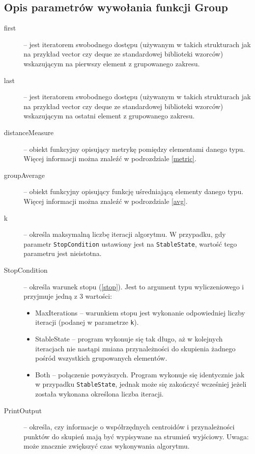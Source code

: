 \subsection{Opis parametrów wywołania funkcji Group}\label{parameters}

\begin{description}
	\item[first] -- jest iteratorem swobodnego dostępu (używanym w takich strukturach jak na przykład vector czy deque ze standardowej biblioteki wzorców) wskazującym na pierwszy element z grupowanego zakresu.
	\item[last] -- jest iteratorem swobodnego dostępu (używanym w takich strukturach jak na przykład vector czy deque ze standardowej biblioteki wzorców) wskazującym na ostatni element z grupowanego zakresu.
	\item[distanceMeasure] -- obiekt funkcyjny opisujący metrykę pomiędzy elementami danego typu. Więcej informacji można znaleźć w podrozdziale \ref{metric}.
	\item[groupAverage] -- obiekt funkcyjny opisujący funkcję uśredniającą elementy danego typu. Więcej informacji można znaleźć w podrozdziale \ref{avg}.
	\item[k] -- określa maksymalną liczbę iteracji algorytmu. W przypadku, gdy parametr \texttt{StopCondition} ustawiony jest na \texttt{StableState}, wartość tego parametru jest nieistotna.
	\item[StopCondition] -- określa warunek stopu (\ref{stop}). Jest to argument typu wyliczeniowego i przyjmuje jedną z 3 wartości:
	\begin{itemize}
		\item MaxIterations -- warunkiem stopu jest wykonanie odpowiedniej liczby iteracji (podanej w parametrze \texttt{k}).
		\item StableState -- program wykonuje się tak długo, aż w kolejnych iteracjach nie nastąpi zmiana przynależności do skupienia żadnego pośród wszystkich grupowanych elementów.
		\item Both -- połączenie powyższych. Program wykonuje się identycznie jak w przypadku \texttt{StableState}, jednak może się zakończyć wcześniej jeżeli została wykonana określona liczba iteracji.
	\end{itemize}
	\item[PrintOutput] -- określa, czy informacje o współrzędnych centroidów i przynależności punktów do skupień mają być wypisywane na strumień wyjściowy. Uwaga: może znacznie zwiększyć czas wykonywania algorytmu.
\end{description}

